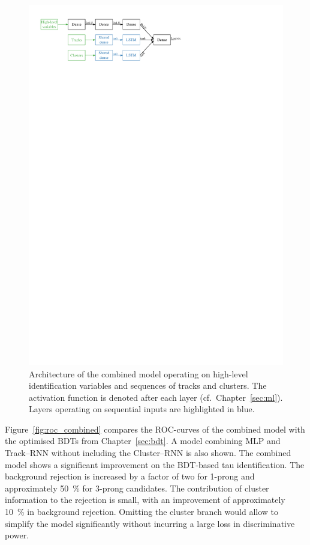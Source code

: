 \begin{figure}[htb]
  \centering
  \includegraphics{./figures/rnn/combined_architecture.pdf}
  \caption{Architecture of the combined model operating on high-level
    identification variables and sequences of tracks and clusters. The
    activation function is denoted after each layer (cf.\ Chapter~\ref{sec:ml}).
    Layers operating on sequential inputs are highlighted in blue.}
  \label{fig:schematic_combined}
\end{figure}

Figure~\ref{fig:roc_combined} compares the ROC-curves of the combined model with
the optimised BDTs from Chapter~\ref{sec:bdt}. A model combining MLP and
Track--RNN without including the Cluster--RNN is also shown. The combined model
shows a significant improvement on the BDT-based tau identification. The
background rejection is increased by a factor of two for 1-prong and
approximately \SI{50}{\percent} for 3-prong candidates. The contribution of
cluster information to the rejection is small, with an improvement of
approximately \SI{10}{\percent} in background rejection. Omitting the cluster
branch would allow to simplify the model significantly without incurring a large
loss in discriminative power. 

